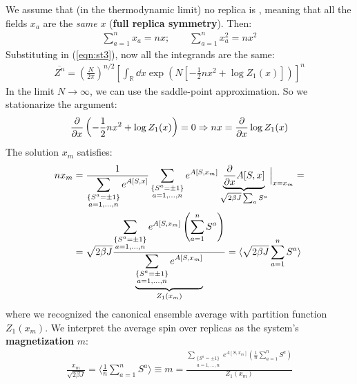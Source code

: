 \documentclass[../template.tex]{subfiles}
\begin{document}
\medskip

We assume that (in the thermodynamic limit) no replica is , meaning that all the fields $x_a$ are the \textit{same} $x$ (\textbf{full replica symmetry}). Then:
\begin{align*}
    \sum_{a=1}^n x_a = nx; \qquad \sum_{a=1}^n x_a^2 = n x^2
\end{align*} 
Substituting in (\ref{eqn:st3}), now all the integrands are the same:
\begin{align}\label{eqn:st4}
    \overline{Z^n} = \left(\frac{N}{2 \pi} \right)^{n/2} \left[\int_{\mathbb{R}} \dd{x}  \exp\left(N \left[-\frac{1}{2} n x^2 + \log Z_1(x) \right]\right)\right]^n
\end{align}
In the limit $N \to \infty$, we can use the saddle-point approximation. So we stationarize the argument:
\begin{align*}
    \pdv{x} \left(-\frac{1}{2} n x^2 + \log Z_1(x) \right) = 0 \Rightarrow nx = \pdv{x} \log Z_1(x)
\end{align*}
The solution $x_m$ satisfies:
\begin{align*}
    n x_m &= \frac{1}{\displaystyle\sum_{\substack{\{S^a = \pm 1\}\\a=1,\dots,n}} e^{A[S, x]}} \sum_{\substack{\{S^a = \pm 1\}\\a=1,\dots,n}} e^{A[S,x_m]} \underbrace{\pdv{x} A[S,x]}_{\sqrt{2 \beta J} \sum_a S^a} \Big|_{x=x_m}  =\\
    &= \sqrt{2 \beta J}\frac{\displaystyle  \sum_{\substack{\{S^a = \pm 1\}\\a=1,\dots,n}} e^{A[S, x_m]} \left(\sum_{a=1}^n S^a\right)}{\displaystyle \underbrace{\sum_{\substack{\{S^a = \pm 1\}\\a=1,\dots,n}} e^{A[S, x_m]}}_{Z_1(x_m)}} = \langle \sqrt{2 \beta J} \sum_{a=1}^n S^a \rangle
\end{align*}
where we recognized the canonical ensemble average with partition function $Z_1(x_m)$. We interpret the average spin over replicas as the system's \textbf{magnetization} $m$:
\begin{align} \label{eqn:magnetization}
    \frac{x_m}{\sqrt{2 \beta J}} = \langle \frac{1}{n} \sum_{a=1}^n S^a  \rangle \equiv m = \frac{\displaystyle \sum_{\substack{\{S^a = \pm 1\}\\a=1,\dots,n}} e^{A[S, x_m]} \left(\frac{1}{n} \sum_{a=1}^n S^a \right)}{Z_1(x_m)} 
\end{align}
\end{document}
